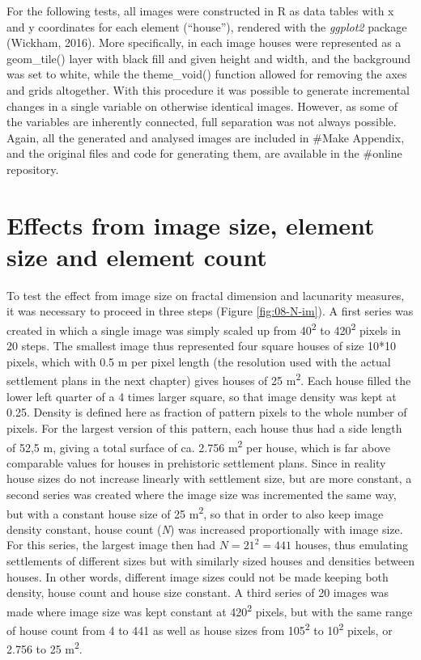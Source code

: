 \documentclass[
  12pt,
]{book}
\begin{document}
For the following tests, all images were constructed in R as data tables with x and y coordinates for each element (``house''), rendered with the \emph{ggplot2} package (Wickham, 2016). More specifically, in each image houses were represented as a geom\_tile() layer with black fill and given height and width, and the background was set to white, while the theme\_void() function allowed for removing the axes and grids altogether. With this procedure it was possible to generate incremental changes in a single variable on otherwise identical images. However, as some of the variables are inherently connected, full separation was not always possible. Again, all the generated and analysed images are included in \#Make Appendix, and the original files and code for generating them, are available in the \#online repository.

\hypertarget{effects-from-image-size-element-size-and-element-count}{%
\section{Effects from image size, element size and element count}\label{effects-from-image-size-element-size-and-element-count}}

To test the effect from image size on fractal dimension and lacunarity measures, it was necessary to proceed in three steps (Figure \ref{fig:08-N-im}). A first series was created in which a single image was simply scaled up from 40\textsuperscript{2} to 420\textsuperscript{2} pixels in 20 steps. The smallest image thus represented four square houses of size 10*10 pixels, which with 0.5 m per pixel length (the resolution used with the actual settlement plans in the next chapter) gives houses of 25 m\textsuperscript{2}. Each house filled the lower left quarter of a 4 times larger square, so that image density was kept at 0.25. Density is defined here as fraction of pattern pixels to the whole number of pixels. For the largest version of this pattern, each house thus had a side length of 52,5 m, giving a total surface of ca. 2.756 m\textsuperscript{2} per house, which is far above comparable values for houses in prehistoric settlement plans. Since in reality house sizes do not increase linearly with settlement size, but are more constant, a second series was created where the image size was incremented the same way, but with a constant house size of 25 m\textsuperscript{2}, so that in order to also keep image density constant, house count (\emph{N}) was increased proportionally with image size. For this series, the largest image then had \(N = 21^2 = 441\) houses, thus emulating settlements of different sizes but with similarly sized houses and densities between houses. In other words, different image sizes could not be made keeping both density, house count and house size constant. A third series of 20 images was made where image size was kept constant at 420\textsuperscript{2} pixels, but with the same range of house count from 4 to 441 as well as house sizes from 105\textsuperscript{2} to 10\textsuperscript{2} pixels, or 2.756 to 25 m\textsuperscript{2}.
\end{document}
